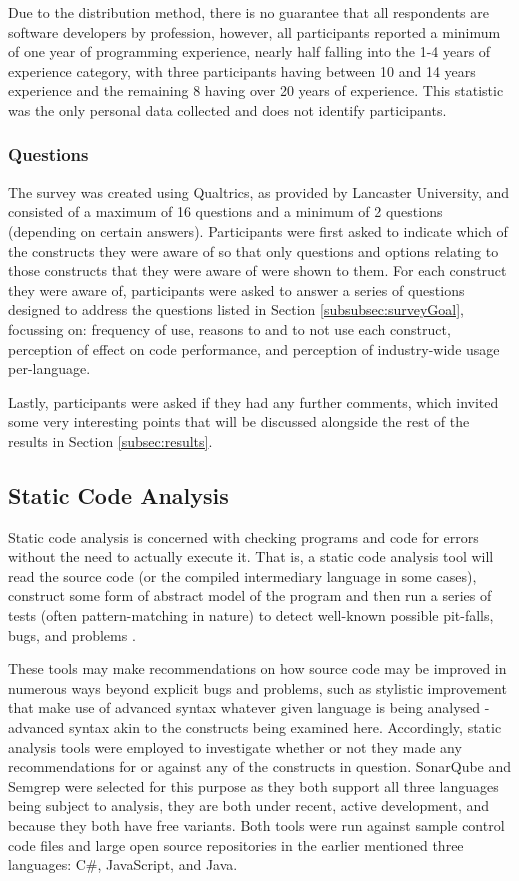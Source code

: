 \documentclass{article}
\begin{document}
            Due to the distribution method, there is no guarantee that all respondents are software developers by profession, however, all participants reported a minimum of one year of programming experience, nearly half falling into the 1-4 years of experience category, with three participants having between 10 and 14 years experience and the remaining 8 having over 20 years of experience. This statistic was the only personal data collected and does not identify participants.
        \subsubsection{Questions}
            The survey was created using Qualtrics, as provided by Lancaster University, and consisted of a maximum of 16 questions and a minimum of 2 questions (depending on certain answers).
            Participants were first asked to indicate which of the constructs they were aware of so that only questions and options relating to those constructs that they were aware of were shown to them. For each construct they were aware of, participants were asked to answer a series of questions designed to address the questions listed in Section \ref{subsubsec:surveyGoal}, focussing on: frequency of use, reasons to and to not use each construct, perception of effect on code performance, and perception of industry-wide usage per-language.
            
            Lastly, participants were asked if they had any further comments, which invited some very interesting points that will be discussed alongside the rest of the results in Section \ref{subsec:results}.
    \subsection{Static Code Analysis}
        Static code analysis is concerned with checking programs and code for errors without the need to actually execute it. That is, a static code analysis tool will read the source code (or the compiled intermediary language in some cases), construct some form of abstract model of the program and then run a series of tests (often pattern-matching in nature) to detect well-known possible pit-falls, bugs, and problems \citep{staticCodeAnalysis}.

        These tools may make recommendations on how source code may be improved in numerous ways beyond explicit bugs and problems, such as stylistic improvement that make use of advanced syntax whatever given language is being analysed - advanced syntax akin to the constructs being examined here. Accordingly, static analysis tools were employed to investigate whether or not they made any recommendations for or against any of the constructs in question. SonarQube and Semgrep were selected for this purpose as they both support all three languages being subject to analysis, they are both under recent, active development, and because they both have free variants. Both tools were run against sample control code files and large open source repositories in the earlier mentioned three languages: C\#, JavaScript, and Java.
            
\end{document}
